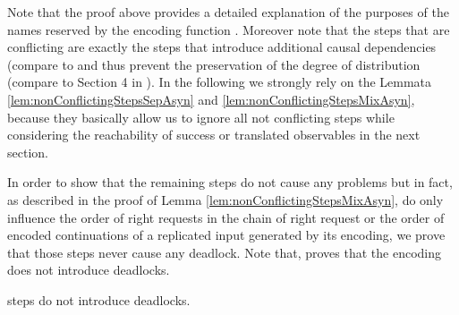 \documentclass[]{llncs}
\begin{document}
Note that the proof above provides a detailed explanation of the purposes of the names reserved by the encoding function . Moreover note that the \pure \admin steps that are conflicting are exactly the steps that introduce additional causal dependencies (compare to \cite{petersSchickeNestmann11} and thus prevent the preservation of the degree of distribution (compare to Section 4 in \cite{petersNestmann12}). In the following we strongly rely on the Lemmata \ref{lem:nonConflictingStepsSepAsyn} and \ref{lem:nonConflictingStepsMixAsyn}, because they basically allow us to ignore all not conflicting steps while considering the reachability of success or translated observables in the next section.

In order to show that the remaining \pure \admin steps do not cause any problems but in fact, as described in the proof of Lemma \ref{lem:nonConflictingStepsMixAsyn}, do only influence the order of right requests in the chain of right request or the order of encoded continuations of a replicated input generated by its encoding, we prove that those steps never cause any deadlock. Note that, \cite{nestmann00} proves that the encoding  does not introduce deadlocks.

\begin{lemma} \label{lem:pureAdminStepsNoDeadlock}
	\Pure \admin steps do not introduce deadlocks.
\end{lemma}
\end{document}
